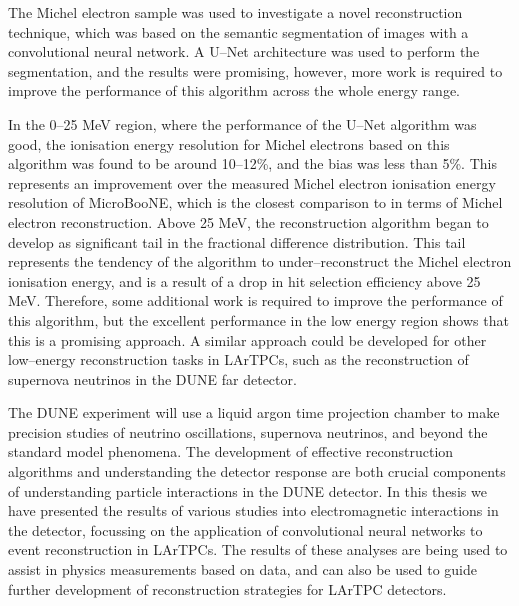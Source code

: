 The Michel electron sample was used to investigate a novel reconstruction
technique, which was based on the semantic segmentation of images with a
convolutional neural network. A U--Net architecture was used to perform the
segmentation, and the results were promising, however, more work is required to
improve the performance of this algorithm across the whole energy range. 

In the 0--25 MeV region, where the performance of the U--Net algorithm was 
good, the ionisation energy resolution for Michel electrons based on this 
algorithm was found to be around 10--12\%, and the bias was less than 
5\%. This represents an improvement over the measured Michel electron ionisation
energy resolution of MicroBooNE, which is the closest comparison to \protodune{}
in terms of Michel electron reconstruction. Above 25 MeV, the reconstruction 
algorithm began to develop as significant tail in the fractional difference 
distribution. This tail represents the tendency of the algorithm to 
under--reconstruct the Michel electron ionisation energy, and is a result of a 
drop in hit selection efficiency above 25 MeV. Therefore, some additional work
is required to improve the performance of this algorithm, but the excellent
performance in the low energy region shows that this is a promising approach. A
similar approach could be developed for other low--energy reconstruction tasks
in LArTPCs, such as the reconstruction of supernova neutrinos in the DUNE far
detector.

The DUNE experiment will use a liquid argon time projection chamber to make
precision studies of neutrino oscillations, supernova neutrinos, and beyond the
standard model phenomena. The development of effective reconstruction algorithms
and understanding the detector response are both crucial components of 
understanding particle interactions in the DUNE detector. In this thesis we have
presented the results of various studies into electromagnetic interactions in
the \protodune{} detector, focussing on the application of convolutional neural
networks to event reconstruction in LArTPCs. The results of these analyses are
being used to assist in physics measurements based on \protodune{} data, and can
also be used to guide further development of reconstruction strategies for 
LArTPC detectors.
